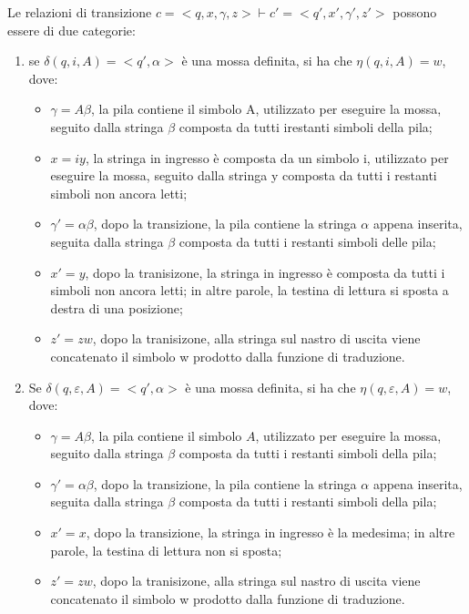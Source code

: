   \vspace{1in}

  Le relazioni di transizione \(c =<q,x,\gamma, z> \vdash c' = <q',x',\gamma',z'>\) possono essere di due categorie:
  \begin{enumerate}
    \item se \(\delta(q,i,A)=<q',\alpha>\) è una mossa definita, si ha che \(\eta(q,i,A) = w\), dove:
    \begin{itemize}
      \item \(\gamma =A\beta\), la pila contiene il simbolo A, utilizzato per eseguire la mossa, seguito dalla stringa \(\beta\) composta da tutti irestanti simboli della pila;
      \item \(x=iy\), la stringa in ingresso è composta da un simbolo i, utilizzato per eseguire la mossa, seguito dalla stringa y composta da tutti i restanti simboli non ancora letti;
      \item \(\gamma'=\alpha\beta\), dopo la transizione, la pila contiene la stringa \(\alpha\) appena inserita, seguita dalla stringa \(\beta\) composta da tutti i restanti simboli delle pila;
      \item \(x'=y\), dopo la tranisizone, la stringa in ingresso è composta da tutti i simboli non ancora letti; in altre parole, la testina di lettura si sposta a destra di una posizione;
      \item \(z'=zw\), dopo la tranisizone, alla stringa sul nastro di uscita viene concatenato il simbolo w prodotto dalla funzione di traduzione.  
    \end{itemize}
    \item Se \(\delta(q,\varepsilon,A)=<q',\alpha>\) è una mossa definita, si ha che \(\eta(q,\varepsilon,A) = w\), dove:
    \begin{itemize}
      \item \(\gamma=A\beta\), la pila contiene il simbolo \(A\), utilizzato per eseguire la mossa, seguito dalla stringa \(\beta\) composta da tutti i restanti simboli della pila;
      \item \(\gamma'=\alpha\beta\), dopo la transizione, la pila contiene la stringa \(\alpha\) appena inserita, seguita dalla stringa \(\beta\) composta da tutti i restanti simboli della pila;
      \item \(x'=x\), dopo la transizione, la stringa in ingresso è la medesima; in altre parole, la testina di lettura non si sposta;
      \item \(z'=zw\), dopo la tranisizone, alla stringa sul nastro di uscita viene concatenato il simbolo w prodotto dalla funzione di traduzione.
    \end{itemize}
  \end{enumerate}

